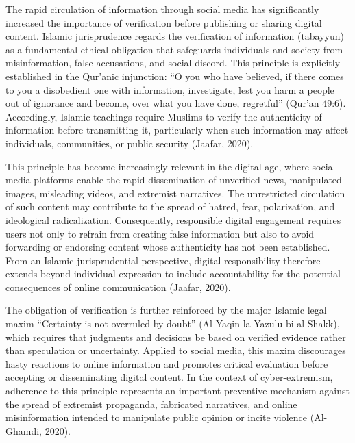 \documentclass[10pt]{NSP1}
\begin{document}
\par\medskip{}\smallskip

The rapid circulation of information through social media has significantly increased the importance of verification before publishing or sharing digital content. Islamic jurisprudence regards the verification of information (tabayyun) as a fundamental ethical obligation that safeguards individuals and society from misinformation, false accusations, and social discord. This principle is explicitly established in the Qur'anic injunction: “O you who have believed, if there comes to you a disobedient one with information, investigate, lest you harm a people out of ignorance and become, over what you have done, regretful” (Qur'an 49:6). Accordingly, Islamic teachings require Muslims to verify the authenticity of information before transmitting it, particularly when such information may affect individuals, communities, or public security (Jaafar, 2020).

This principle has become increasingly relevant in the digital age, where social media platforms enable the rapid dissemination of unverified news, manipulated images, misleading videos, and extremist narratives. The unrestricted circulation of such content may contribute to the spread of hatred, fear, polarization, and ideological radicalization. Consequently, responsible digital engagement requires users not only to refrain from creating false information but also to avoid forwarding or endorsing content whose authenticity has not been established. From an Islamic jurisprudential perspective, digital responsibility therefore extends beyond individual expression to include accountability for the potential consequences of online communication (Jaafar, 2020).

The obligation of verification is further reinforced by the major Islamic legal maxim “Certainty is not overruled by doubt” (Al-Yaqin la Yazulu bi al-Shakk), which requires that judgments and decisions be based on verified evidence rather than speculation or uncertainty. Applied to social media, this maxim discourages hasty reactions to online information and promotes critical evaluation before accepting or disseminating digital content. In the context of cyber-extremism, adherence to this principle represents an important preventive mechanism against the spread of extremist propaganda, fabricated narratives, and online misinformation intended to manipulate public opinion or incite violence (Al-Ghamdi, 2020).
\end{document}
